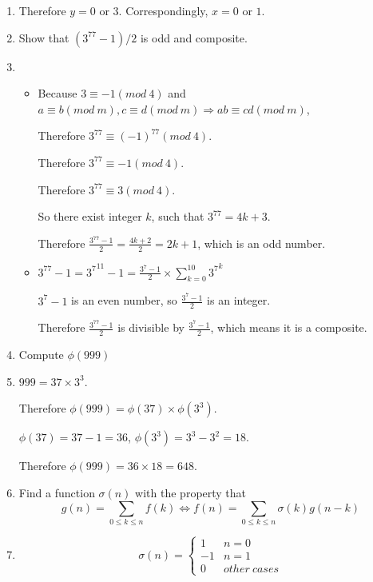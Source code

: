 \documentclass[12pt,a4paper]{article}
\makeatletter
\newtheorem*{solution}{Solution}
\theoremstyle{definition}
\renewenvironment{solution}[1][Solution] {\par\pushQED{\qed}\normalfont\topsep6\p@\@plus6\p@\relax\trivlist\item[\hskip\labelsep\bfseries#1\@addpunct{.}]\ignorespaces}{\popQED\endtrivlist\@endpefalse} \makeatother
\makeatother
\begin{document}
\begin{enumerate}
\begin{solution}
	    	Therefore $y=0$ or $3$.
	    	Correspondingly, $x=0$ or $1$.
	    \end{solution}
	\item 
	    Show that $(3^{77}-1)/2$ is odd and composite.
	    \begin{solution}
	    	\begin{itemize}
	    		\item
	    		Because $3\equiv -1(mod\ 4)$ and $a\equiv b(mod\ m), c\equiv d(mod\ m)\Rightarrow ab\equiv cd(mod\ m)$,
	    		
	    		Therefore $3^{77}\equiv (-1)^{77}(mod\ 4)$.
	    		
	    		Therefore $3^{77}\equiv -1(mod\ 4)$.
	    		
	    		Therefore $3^{77}\equiv 3(mod\ 4)$.
	    		
	    		So there exist integer $k$, such that $3^{77}=4k+3$.
	    		
	    		Therefore $\frac{3^{77}-1}{2}=\frac{4k+2}{2}=2k+1$, which is an odd number.
	    		\item 
	    		$3^{77}-1={3^{7}}^{11}-1=\frac{3^7-1}{2}\times\sum_{k=0}^{10}{3^7}^{k}$
	    		
	    		$3^7-1$ is an even number, so $\frac{3^7-1}{2}$ is an integer.
	    		
	    		Therefore $\frac{3^{77}-1}{2}$ is divisible by $\frac{3^7-1}{2}$, which means it is a composite.
	    	\end{itemize}
	    	
	    	
	    	
	    \end{solution}
	\item 
	    Compute $\phi(999)$
	    \begin{solution}
	    	$999=37\times3^3$.
	    	
	    	Therefore $\phi(999)=\phi(37)\times\phi(3^3)$.
	    	
	    	$\phi(37)=37-1=36$, $\phi(3^3)=3^3-3^2=18$.
	    	
	    	Therefore $\phi(999)=36\times18=648$.
	    \end{solution}
	\item 
	    Find a function $\sigma(n)$ with the property that
	    \begin{equation*}
	        g(n)=\sum_{0\le k\le n}f(k) \Leftrightarrow f(n)=\sum_{0\le k\le n} \sigma(k)g(n-k)
	    \end{equation*}
	    \begin{solution}
	    	\begin{equation*}
	    	    \sigma(n)=
	    	    \begin{cases}
	    	        1&n=0\\
	    	        -1&n=1\\
	    	        0&other\ cases
	    	    \end{cases}
	    	\end{equation*}
	    	

\end{solution}
\end{enumerate}
\end{document}
